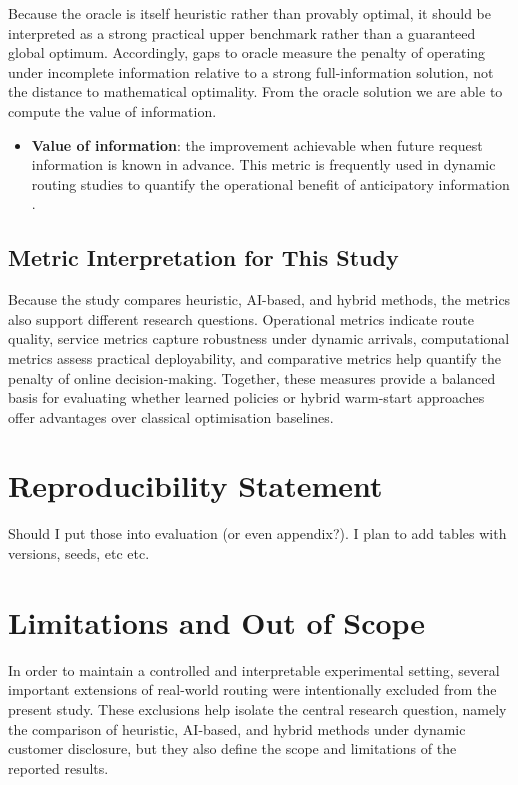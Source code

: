 Because the oracle is itself heuristic rather than provably optimal, it should
be interpreted as a strong practical upper benchmark rather than a guaranteed
global optimum. Accordingly, gaps to oracle measure the penalty of operating
under incomplete information relative to a strong full-information solution, not
the distance to mathematical optimality. From the oracle solution we are able to
compute the value of information.

\begin{itemize}
    \item \textbf{Value of information}: the improvement achievable when future request information is known in advance. This metric is frequently used in dynamic routing studies to quantify the operational benefit of anticipatory information \cite{valueOfInformation}.
\end{itemize}

\subsection{Metric Interpretation for This Study}

Because the study compares heuristic, AI-based, and hybrid methods, the metrics
also support different research questions. Operational metrics indicate route
quality, service metrics capture robustness under dynamic arrivals,
computational metrics assess practical deployability, and comparative metrics
help quantify the penalty of online decision-making. Together, these measures
provide a balanced basis for evaluating whether learned policies or hybrid
warm-start approaches offer advantages over classical optimisation baselines.
\section{Reproducibility Statement}
{\color{red} Should I put those into evaluation (or even appendix?). I plan to
add tables with versions, seeds, etc etc.}



\section{Limitations and Out of Scope}
\label{limitations}

In order to maintain a controlled and interpretable experimental setting,
several important extensions of real-world routing were intentionally excluded
from the present study. These exclusions help isolate the central research
question, namely the comparison of heuristic, AI-based, and hybrid methods under
dynamic customer disclosure, but they also define the scope and limitations of
the reported results.

